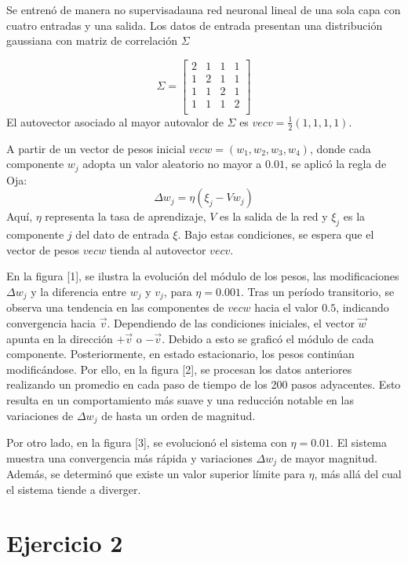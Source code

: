\documentclass[aps,prb,twocolumn,superscriptaddress,floatfix,longbibliography]{revtex4-2}
\newcounter{para}
\begin{document}
Se entrenó de manera no supervisadauna red neuronal lineal de una sola capa con cuatro entradas y una salida. Los datos de entrada presentan una distribución gaussiana con matriz de correlación $\Sigma$



\[
\Sigma = \begin{bmatrix}
2 & 1 & 1 & 1 \\
1 & 2 & 1 & 1 \\
1 & 1 & 2 & 1 \\
1 & 1 & 1 & 2 \\
\end{bmatrix}
\]
El autovector asociado al mayor autovalor de $\Sigma$ es $vec{v} = \frac{1}{2}(1, 1, 1, 1)$. 


A partir de un vector de pesos inicial $vec{w} = (w_1, w_2, w_3, w_4)$, donde cada componente $w_j$ adopta un valor aleatorio no mayor a $0.01$, se aplicó la regla de Oja:
\[
\Delta w_j = \eta ( \xi_j - V w_j )
\]
Aquí, $\eta$ representa la tasa de aprendizaje, $V$ es la salida de la red y $\xi_j$ es la componente $j$ del dato de entrada $\xi$. Bajo estas condiciones, se espera que el vector de pesos $vec{w}$ tienda al autovector $vec{v}$.


En la figura [1], se ilustra la evolución del módulo de los pesos, las modificaciones $\Delta w_j$ y la diferencia entre $w_j$ y $v_j$, para $\eta = 0.001$. Tras un período transitorio, se observa una tendencia en las componentes de $vec{w}$ hacia el valor $0.5$, indicando convergencia hacia $\vec{v}$. Dependiendo de las condiciones iniciales, el vector $\vec{w}$ apunta en la dirección $+\vec{v}$ o $-\vec{v}$. Debido a esto se graficó el módulo de cada componente. Posteriormente, en estado estacionario, los pesos continúan modificándose. Por ello, en la figura [2], se procesan los datos anteriores realizando un promedio en cada paso de tiempo de los 200 pasos adyacentes. Esto resulta en un comportamiento más suave y una reducción notable en las variaciones de $\Delta w_j$ de hasta un orden de magnitud.

Por otro lado, en la figura [3], se evolucionó el sistema con $\eta = 0.01$. El sistema muestra una convergencia más rápida y variaciones $\Delta w_j$ de mayor magnitud. Además, se determinó que existe un valor superior límite para $\eta$, más allá del cual el sistema tiende a diverger.

\section*{Ejercicio 2}
\end{document}

